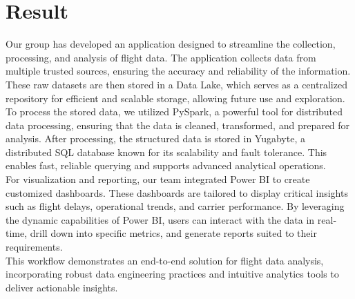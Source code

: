 \documentclass[12pt,a4paper]{article}
\begin{document}
\section{Result}
Our group has developed an application designed to streamline the collection, processing, and analysis of flight data. The application collects data from multiple trusted sources, ensuring the accuracy and reliability of the information. These raw datasets are then stored in a Data Lake, which serves as a centralized repository for efficient and scalable storage, allowing future use and exploration.\\
To process the stored data, we utilized PySpark, a powerful tool for distributed data processing, ensuring that the data is cleaned, transformed, and prepared for analysis. After processing, the structured data is stored in Yugabyte, a distributed SQL database known for its scalability and fault tolerance. This enables fast, reliable querying and supports advanced analytical operations.\\
For visualization and reporting, our team integrated Power BI to create customized dashboards. These dashboards are tailored to display critical insights such as flight delays, operational trends, and carrier performance. By leveraging the dynamic capabilities of Power BI, users can interact with the data in real-time, drill down into specific metrics, and generate reports suited to their requirements.\\
This workflow demonstrates an end-to-end solution for flight data analysis, incorporating robust data engineering practices and intuitive analytics tools to deliver actionable insights.\\
\end{document}
